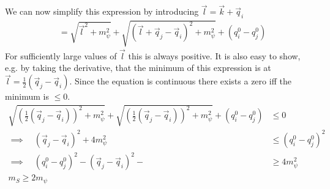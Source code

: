 We can now simplify this expression by introducing $\vec{l} = \vec{k}+\vec{q}_i$
\begin{align}
    &= \sqrt{\vec{l}^2+m_\psi^2} + \sqrt{(\vec{l}+\vec{q}_j-\vec{q}_i)^2+m_\psi^2} + (q^0_i - q^0_j)
\end{align}
For sufficiently large values of $\vec{l}$ this is always positive. It is also easy to show, e.g. by taking the derivative, that the minimum of this expression is at $\vec{l} = \frac{1}{2} (\vec{q}_j-\vec{q}_i)$. Since the equation is continuous there exists a zero iff the minimum is $\leq 0$.
\begin{align}
    \sqrt{(\frac{1}{2} (\vec{q}_j-\vec{q}_i))^2+m_\psi^2} + \sqrt{(\frac{1}{2}(\vec{q}_j-\vec{q}_i))^2+m_\psi^2} + (q^0_i - q^0_j) &\leq 0\\
    \implies\quad (\vec{q}_j-\vec{q}_i)^2 + 4 m_\psi^2 &\leq (q^0_i - q^0_j)^2\\
    \implies\quad (q^0_i - q^0_j)^2 - (\vec{q}_j-\vec{q}_i)^2 -  &\geq 4 m_\psi^2\\
    m_S \geq 2 m_\psi
\end{align}